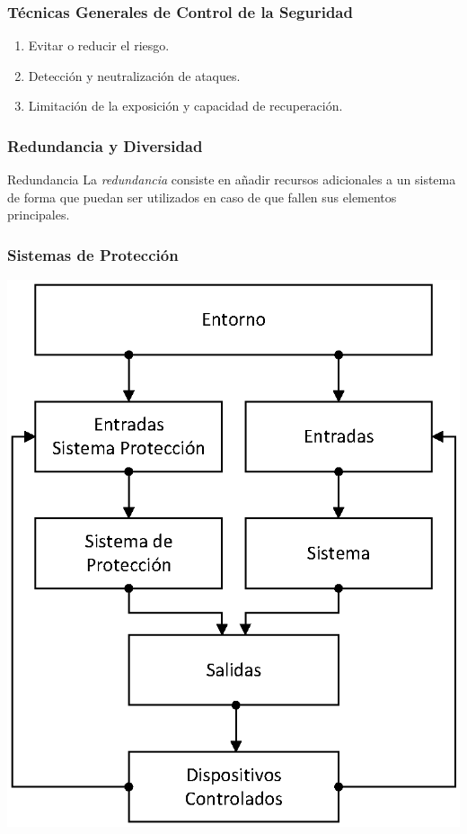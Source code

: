 \documentclass[handout,a4paper,slidestop,xcolor=pst,dvips,blue]{beamer}
\begin{document}
\begin{frame}[c]
    \frametitle{Técnicas Generales de Control de la Seguridad}
    \begin{enumerate}[<+->]
        \item Evitar o reducir el riesgo.
        \item Detección y neutralización de ataques.
        \item Limitación de la exposición y capacidad de recuperación.
    \end{enumerate}
\end{frame}

\begin{frame}[c]
    \frametitle{Redundancia y Diversidad}
    \begin{block}{Redundancia}
        La \emph{redundancia} consiste en añadir recursos adicionales a un sistema de forma que puedan ser utilizados en caso de
        que fallen sus elementos principales.
    \end{block}
\end{frame}

\begin{frame}[c]
    \frametitle{Sistemas de Protección}
    \begin{center}	
        \includegraphics[width=0.50\linewidth,keepaspectratio=true]{images/security/sistemaProteccion.eps}
    \end{center}
\end{frame}
\end{document}
